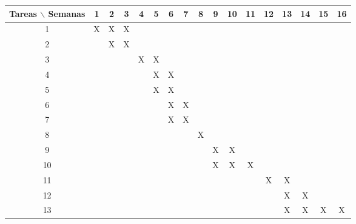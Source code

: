 \documentclass[12pt]{article}
\begin{document}
\begin{table}[htb]
	\begin{tabular}{|c|cccccccccccccccc| }
	\hline
	Tareas $\backslash$ Semanas & 1 & 2 & 3 & 4 & 5 & 6 & 7 & 8 & 9 & 10 & 11 & 12 & 13 & 14 & 15 & 16  \\
	\hline
	1 & X & X & X  &   &   &   &   &  &  &   &   &   &   &   &   &   \\
	2 &   & X & X &   &  &  &   &   &   &   &   &   &   &   &   &   \\
	3 &   &   &   & X & X  &   &   &  &   &   &   &  &   &   &  &   \\
	4 &  &  &  &  & X & X &  &  &  &  &   &   &   &   &   &   \\
	5 &   &   &   &   & X & X  &   &   &  &   &   &  &   &   &  &   \\
        6 &   &   &   &   &  & X  & X  &   &  &   &   &  &   &   &  &   \\
        7 &   &   &   &   &  & X  & X  &   &  &   &   &  &   &   &  &   \\
        8 &   &   &   &   & &   &   & X  &  &   &   &  &   &   &  &   \\
        9 &   &   &   &   &  &   &   &   & X & X  &   &  &   &   &  &   \\
        10 &   &   &   &   &  &   &   &   & X & X  & X  &  &   &   &  &   \\
        11 &   &   &   &   &  &   &   &   &  &   &   & X & X  &   &  &   \\
        12 &   &   &   &   &  &   &   &   &  &   &   &  & X  & X  &  &   \\
        13 &   &   &   &   &  &   &   &   &  &   &   &   & X  & X  & X & X \\
	\hline
	\end{tabular}
\end{table}
\vspace{1mm}
\end{document}
